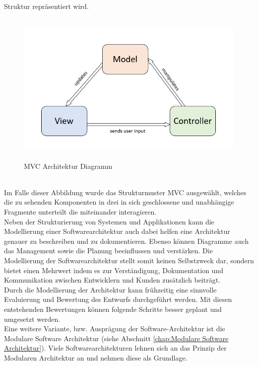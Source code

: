 Struktur repräsentiert wird.
\begin{figure}[hbt!]
    \centering
    \includegraphics[width=15cm,height=7.5cm,keepaspectratio]{2GrundlagenX/Bilder/MVCArchitecture.png}
    \caption{MVC Architektur Diagramm \cite{mvcbild.2020}}
    \label{pic:mvcdiagram}
\end{figure} 
\\
Im Falle dieser Abbildung wurde das Strukturmuster \ac{MVC} ausgewählt, welches die zu sehenden Komponenten in drei in sich 
geschlossene und unabhängige Fragmente unterteilt die miteinander interagieren. 
\\ 
\linebreak
Neben der Strukturierung von Systemen und Applikationen kann die Modellierung einer Softwarearchitektur auch dabei helfen eine Architektur genauer 
zu beschreiben und zu dokumentieren. Ebenso können Diagramme auch das Management sowie die Planung beeinflussen und verstärken. Die Modellierung 
der Softwarearchitektur stellt somit keinen Selbstzweck dar, sondern bietet einen Mehrwert indem es zur Verständigung, Dokumentation und 
Kommunikation zwischen Entwicklern und Kunden zusätzlich beiträgt. 
\\ 
Durch die Modellierung der Architektur kann frühzeitig eine sinnvolle Evaluierung und Bewertung des Entwurfs durchgeführt werden. Mit diesen 
entstehenden Bewertungen können folgende Schritte besser geplant und umgesetzt werden. 
\\ 
\linebreak
Eine weitere Variante, bzw. Ausprägung der Software-Architektur ist die Modulare Software Architektur (siehe Abschnitt \ref{chap:Modulare Software Architektur}).
Viele Softwarearchitekturen lehnen sich an das Prinzip der Modularen Architektur an und nehmen diese als Grundlage.
